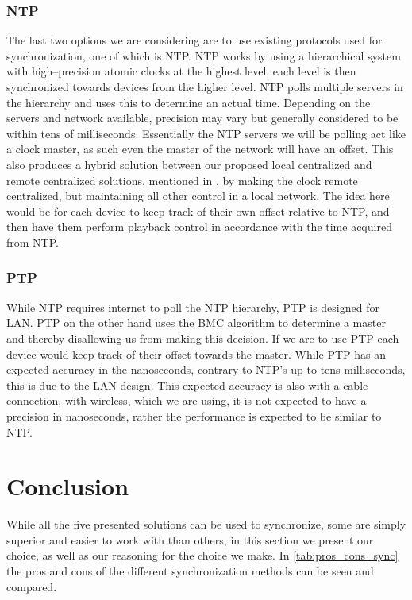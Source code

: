 \subsubsection{\acl{NTP}}
The last two options we are considering are to use existing protocols used for synchronization, one of which is \ac{NTP}.
\ac{NTP} works by using a hierarchical system with high--precision atomic clocks at the highest level, each level is then synchronized towards devices from the higher level.
\ac{NTP} polls multiple servers in the hierarchy and uses this to determine an actual time.
Depending on the servers and network available, precision may vary but generally considered to be within tens of milliseconds.
Essentially the \ac{NTP} servers we will be polling act like a clock master, as such even the master of the network will have an offset.
This also produces a hybrid solution between our proposed local centralized and remote centralized solutions, mentioned in , by making the clock remote centralized, but maintaining all other control in a local network.
The idea here would be for each device to keep track of their own offset relative to \ac{NTP}, and then have them perform playback control in accordance with the time acquired from \ac{NTP}. 

\subsubsection{\acl{PTP}}
While \ac{NTP} requires internet to poll the \ac{NTP} hierarchy, \ac{PTP} is designed for LAN.
\ac{PTP} on the other hand uses the \ac{BMC} algorithm to determine a master and thereby disallowing us from making this decision.
If we are to use \ac{PTP} each device would keep track of their offset towards the master.
While \ac{PTP} has an expected accuracy in the nanoseconds, contrary to NTP's up to tens milliseconds, this is due to the LAN design.
This expected accuracy is also with a cable connection, with wireless, which we are using, it is not expected to have a precision in nanoseconds, rather the performance is expected to be similar to \ac{NTP}.


\section{Conclusion}
While all the five presented solutions can be used to synchronize, some are simply superior and easier to work with than others, in this section we present our choice, as well as our reasoning for the choice we make.
In \cref{tab:pros_cons_sync} the pros and cons of the different synchronization methods can be seen and compared. 

